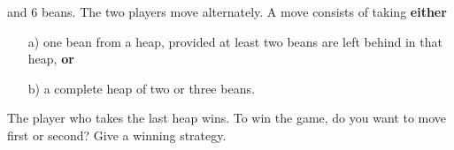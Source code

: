 and 6 beans. The two players move alternately. A move consists of
taking \textbf{either}
\begin{itemize}
\item[a)] one bean from a heap, provided at least two beans are
left behind in that heap, \textbf{or}

\item[b)] a complete heap of two or three beans.
\end{itemize}
The player who takes the last heap wins. To win the game, do you
want to move first or second? Give a winning strategy.
